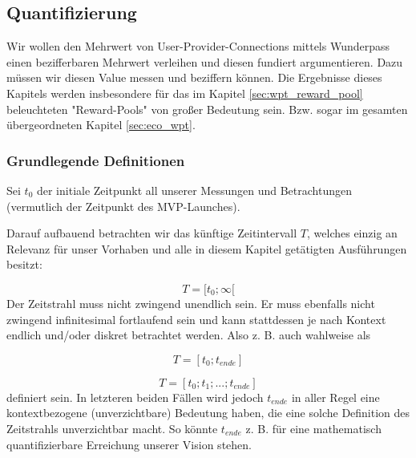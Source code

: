 \subsection{Quantifizierung}
\label{sec:eco_zahlen}

Wir wollen den Mehrwert von User-Provider-Connections mittels Wunderpass einen bezifferbaren Mehrwert verleihen und diesen fundiert argumentieren. Dazu müssen wir diesen Value messen und beziffern können. Die Ergebnisse dieses Kapitels werden insbesondere für das im Kapitel \ref{sec:wpt_reward_pool} beleuchteten "Reward-Pools" von großer Bedeutung sein. Bzw. sogar im gesamten übergeordneten Kapitel \ref{sec:eco_wpt}.

\subsubsection{Grundlegende Definitionen}
\label{sec:eco_zahlen_def}


Sei $t_0$ der initiale Zeitpunkt all unserer Messungen und Betrachtungen (vermutlich der Zeitpunkt des MVP-Launches).

Darauf aufbauend betrachten wir das künftige Zeitintervall $T$, welches einzig an Relevanz für unser Vorhaben und alle in diesem Kapitel getätigten Ausführungen besitzt:

\begin{equation*}
  T = [t_0; \infty[
\end{equation*}
Der Zeitstrahl muss nicht zwingend unendlich sein. Er muss ebenfalls nicht zwingend infinitesimal fortlaufend sein und kann stattdessen je nach Kontext endlich und/oder diskret betrachtet werden. Also z. B. auch wahlweise als 

\begin{equation*}
  T = [t_0; t_{ende}]
\end{equation*}

\begin{equation*}
  T = [t_0; t_1;...; t_{ende}]
\end{equation*}
definiert sein. In letzteren beiden Fällen wird jedoch $t_{ende}$ in aller Regel eine kontextbezogene (unverzichtbare) Bedeutung haben, die eine solche Definition des Zeitstrahls unverzichtbar macht. So könnte $t_{ende}$ z. B. für eine mathematisch quantifizierbare Erreichung unserer Vision stehen. \\

